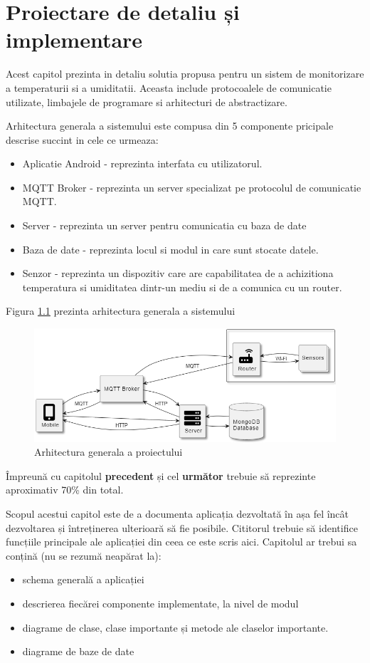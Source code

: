 \chapter{Proiectare de detaliu și implementare}
\pagestyle{fancy}

Acest capitol prezinta in detaliu solutia propusa pentru un sistem de monitorizare a temperaturii si a umiditatii. Aceasta include protocoalele de 
comunicatie utilizate, limbajele de programare si arhitecturi de abstractizare.

Arhitectura generala a sistemului este compusa din 5 componente pricipale descrise succint in cele ce urmeaza:
\begin{itemize}
	\item Aplicatie Android - reprezinta interfata cu utilizatorul.
	\item MQTT Broker - reprezinta un server specializat pe protocolul de comunicatie MQTT.
	\item Server - reprezinta un server pentru comunicatia cu baza de date
	\item Baza de date - reprezinta locul si modul in care sunt stocate datele.
	\item Senzor - reprezinta un dispozitiv care are capabilitatea de a achizitiona temperatura si umiditatea dintr-un mediu si de a comunica cu un router.
\end{itemize}

Figura \ref{fig:ArhitecturaGenerala} prezinta arhitectura generala a sistemului 
\begin{figure}[H]
    \centering
    \includegraphics[scale=0.76]{figs/ArhitecturaGenerala.png}
    \caption{Arhitectura generala a proiectului}
    \label{fig:ArhitecturaGenerala}
\end{figure}


{\color{blue}Împreună cu capitolul \textbf{precedent} și cel \textbf{următor} trebuie să reprezinte aproximativ 70\% din total.\\}

Scopul acestui capitol este de a documenta aplicația dezvoltată în așa fel încât dezvoltarea și întreținerea ulterioară să fie posibile.
Cititorul trebuie să identifice funcțiile principale ale aplicației din ceea ce este scris aici.
Capitolul ar trebui sa conțină (nu se rezumă neapărat la):
\begin{itemize}
	\item schema generală a aplicației
	\item descrierea fiecărei componente implementate, la nivel de modul
	\item diagrame de clase, clase importante și metode ale claselor importante.
    \item diagrame de baze de date
\end{itemize}
